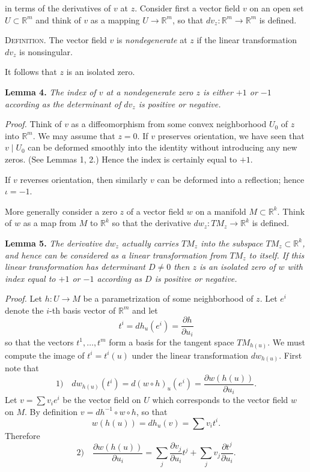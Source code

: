 
in terms of the derivatives of $v$ at $z$. Consider first a vector field $v$ on an open set $U \subset \mathbb{R}^m$ and think of $v$ as a mapping $U \to \mathbb{R}^m$, so that $dv_z : \mathbb{R}^m \to \mathbb{R}^m$ is defined.

\textsc{Definition.} The vector field $v$ is \emph{nondegenerate} at $z$ if the linear transformation $dv_z$ is nonsingular.

It follows that $z$ is an isolated zero.

\noindent\textbf{Lemma 4.} \textit{The index of $v$ at a nondegenerate zero $z$ is either $+1$ or $-1$ according as the determinant of $dv_z$ is positive or negative.}

\noindent\textit{Proof.}
Think of $v$ as a diffeomorphism from some convex neighborhood $U_0$ of $z$ into $\mathbb{R}^m$. We may assume that $z = 0$. If $v$ preserves orientation, we have seen that $v \mid U_0$ can be deformed smoothly into the identity without introducing any new zeros. (See Lemmas 1, 2.) Hence the index is certainly equal to $+1$.

If $v$ reverses orientation, then similarly $v$ can be deformed into a reflection; hence $\iota = -1$.

More generally consider a zero $z$ of a vector field $w$ on a manifold $M \subset \mathbb{R}^k$. Think of $w$ as a map from $M$ to $\mathbb{R}^k$ so that the derivative $dw_z : TM_z \to \mathbb{R}^k$ is defined.

\noindent\textbf{Lemma 5.} \textit{The derivative $dw_z$ actually carries $TM_z$ into the subspace $TM_z \subset \mathbb{R}^k$, and hence can be considered as a linear transformation from $TM_z$ to itself. If this linear transformation has determinant $D \neq 0$ then $z$ is an isolated zero of $w$ with index equal to $+1$ or $-1$ according as $D$ is positive or negative.}

\noindent\textit{Proof.}
Let $h : U \to M$ be a parametrization of some neighborhood of $z$. Let $e^i$ denote the $i$-th basis vector of $\mathbb{R}^m$ and let
\[
t^i = dh_u(e^i) = \frac{\partial h}{\partial u_i}
\]
so that the vectors $t^1, \ldots, t^m$ form a basis for the tangent space $TM_{h(u)}$. We must compute the image of $t^i = t^i(u)$ under the linear transformation $dw_{h(u)}$. First note that
\[
\text{1)} \quad dw_{h(u)}(t^i) = d(w \circ h)_u(e^i) = \frac{\partial w(h(u))}{\partial u_i}.
\]
Let $v = \sum v_i e^i$ be the vector field on $U$ which corresponds to the vector field $w$ on $M$. By definition $v = dh^{-1} \circ w \circ h$, so that
\[
w(h(u)) = dh_u(v) = \sum v_i t^i.
\]
Therefore
\[
\text{2)} \quad \frac{\partial w(h(u))}{\partial u_i} = \sum_j \frac{\partial v_j}{\partial u_i} t^j + \sum_j v_j \frac{\partial t^j}{\partial u_i}.
\]


